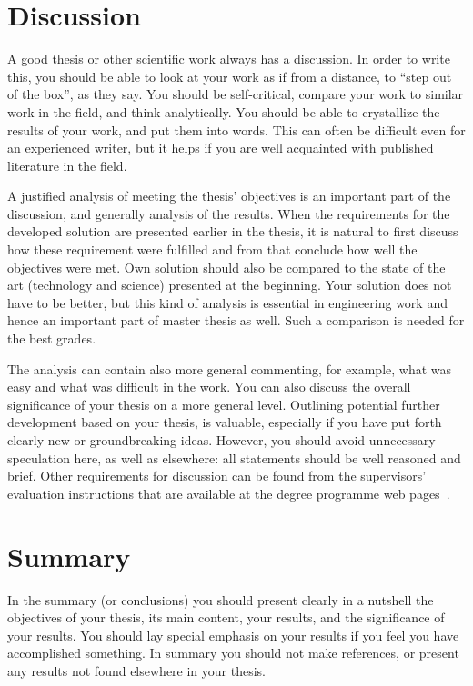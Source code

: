 \section{Discussion}

A good thesis or other scientific work always has a discussion. In order to write this, you should be able to look at your work as if from a distance, to \enquote{step out of the box}, as they say. You should be self-critical, compare your work to similar work in the field, and think analytically. You should be able to crystallize the results of your work, and put them into words. This can often be difficult even for an experienced writer, but it helps if you are well acquainted with published literature in the field.

A justified analysis of meeting the thesis’ objectives is an important part of the discussion, and generally analysis of the results. When the requirements for the developed solution are presented earlier in the thesis, it is natural to first discuss how these requirement were fulfilled and from that conclude how well the objectives were met. Own solution should also be compared to the state of the art (technology and science) presented at the beginning. Your solution does not have to be better, but this kind of analysis is essential in engineering work and hence an important part of master thesis as well. Such a comparison is needed for the best grades.

The analysis can contain also more general commenting, for example, what was easy and what was difficult in the work. You can also discuss the overall significance of your thesis on a more general level. Outlining potential further development based on your thesis, is valuable, especially if you have put forth clearly new or groundbreaking ideas. However, you should avoid unnecessary speculation here, as well as elsewhere: all statements should be well reasoned and brief. Other requirements for discussion can be found from the supervisors’ evaluation instructions that are available at the degree programme web pages~\cite{mscstudies}.

\section{Summary}

In the summary (or conclusions) you should present clearly in a nutshell the objectives of your thesis, its main content, your results, and the significance of your results. You should lay special emphasis on your results if you feel you have accomplished something. In summary you should not make references, or present any results not found elsewhere in your thesis.


